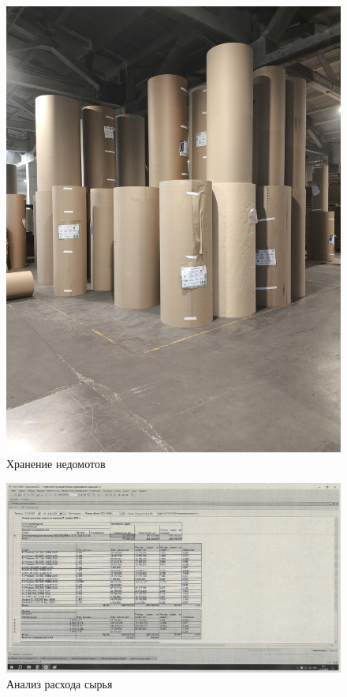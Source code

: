\begin{figure}
\begin{center}
 \includegraphics[height=0.4\textheight, keepaspectratio]{Pics/V недомоты.jpg}
\end{center}
 \caption{Хранение недомотов}
 \label{pic:V недомоты}
\end{figure}

\begin{figure}
\begin{center}
 \includegraphics[height=0.37\textheight, keepaspectratio]{Pics/IV.2..jpg}
\end{center}
 \caption{Анализ расхода сырья}
 \label{pic:IV.2.}
\end{figure}

